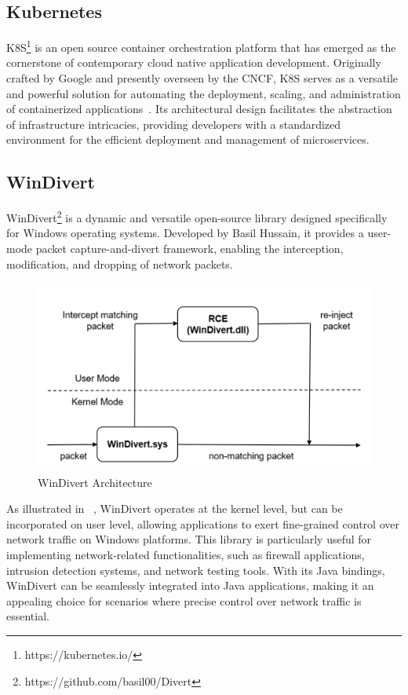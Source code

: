 \subsection{Kubernetes}
\label{subsec:kubernetes}
\acf{K8S}\footnote{https://kubernetes.io/} is an open source container orchestration platform that has emerged as the cornerstone of contemporary cloud native application development. Originally crafted by Google and presently overseen by the \ac{CNCF}, \ac{K8S} serves as a versatile and powerful solution for automating the deployment, scaling, and administration of containerized applications~\cite{burns2022kubernetes}. Its architectural design facilitates the abstraction of infrastructure intricacies, providing developers with a standardized environment for the efficient deployment and management of microservices.~\cite{noauthor_production-grade_nodate}

\subsection{WinDivert}
WinDivert\footnote{https://github.com/basil00/Divert} is a dynamic and versatile open-source library designed specifically for Windows operating systems. Developed by Basil Hussain, it provides a user-mode packet capture-and-divert framework, enabling the interception, modification, and dropping of network packets.

\begin{figure}
    \centering
    \includegraphics[width=\linewidth]{files/figures/WinDivert.png}
    \caption{WinDivert Architecture}
    \label{fig:WinDivert}
\end{figure}

As illustrated in ~, WinDivert operates at the kernel level, but can be incorporated on user level, allowing applications to exert fine-grained control over network traffic on Windows platforms. This library is particularly useful for implementing network-related functionalities, such as firewall applications, intrusion detection systems, and network testing tools. With its Java bindings, WinDivert can be seamlessly integrated into Java applications, making it an appealing choice for scenarios where precise control over network traffic is essential.~\cite{noauthor_windivert:_nodate}

